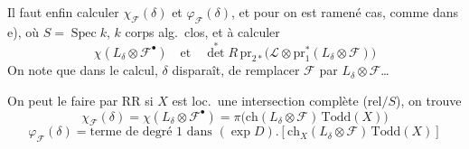 \documentclass[11pt,a4paper]{article}
\begin{document}
Il faut enfin calculer $\chi_{\mathcal{F}}(\delta)$ et
$\varphi_{\mathcal{F}}(\delta)$, et pour \ill{} \ill{} on est ramené \ill{}
 cas, comme dans e), où $S = \operatorname{Spec} k$, $k$ corps
alg.\ clos, et à calculer
\[
\chi(L_{\delta} \otimes \mathcal{F}^{\bullet}) \quad\text{et}\quad
{\det}^{*} R\,\mathrm{pr}_{2*}\bigl(\mathcal{L} \otimes \mathrm{pr}_1^{*}(L_{\delta} \otimes \mathcal{F})\bigr)
\]
On note que dans le calcul, $\delta$ disparaît, 
 de remplacer  $\mathcal{F}$ par
$L_{\delta} \otimes \mathcal{F}$\ldots


On peut le faire par RR si $X$ est loc.\ une intersection complète (rel$/S$),
on trouve
\[
\chi_{\mathcal{F}}(\delta) = \chi(L_{\delta} \otimes \mathcal{F}^{\bullet})
= \pi\bigl(\mathrm{ch}(L_{\delta} \otimes \mathcal{F})\, \mathrm{Todd}(X)\bigr)
\]
\[
\varphi_{\mathcal{F}}(\delta) = \text{terme de degré 1 dans }
(\exp D) . [\mathrm{ch}_X(L_{\delta} \otimes \mathcal{F})\, \mathrm{Todd}(X)]
\]
\end{document}
